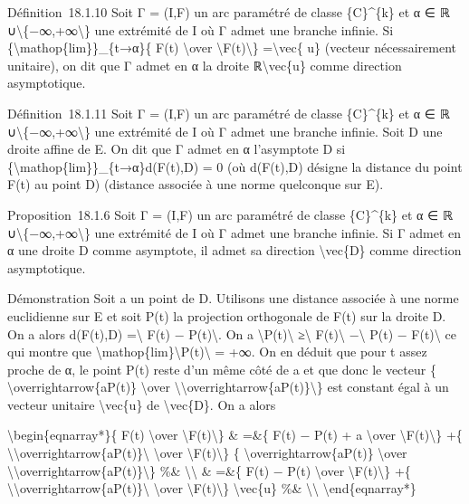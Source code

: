 \documentclass[]{article}
\begin{document}
Définition~18.1.10 Soit Γ = (I,F) un arc paramétré de classe
\{C\}\^{}\{k\} et α ∈ ℝ ∪\textbackslash{}\{−∞,+∞\textbackslash{}\} une
extrémité de I où Γ admet une branche infinie. Si
\{\textbackslash{}mathop\{lim\}\}\_\{t→α\}\{ F(t) \textbackslash{}over
\textbackslash{}\textbar{}F(t)\textbackslash{}\textbar{}\}
=\textbackslash{}vec\{ u\} (vecteur nécessairement unitaire), on dit que
Γ admet en α la droite ℝ\textbackslash{}vec\{u\} comme direction
asymptotique.

Définition~18.1.11 Soit Γ = (I,F) un arc paramétré de classe
\{C\}\^{}\{k\} et α ∈ ℝ ∪\textbackslash{}\{−∞,+∞\textbackslash{}\} une
extrémité de I où Γ admet une branche infinie. Soit D une droite affine
de E. On dit que Γ admet en α l'asymptote D si
\{\textbackslash{}mathop\{lim\}\}\_\{t→α\}d(F(t),D) = 0 (où d(F(t),D)
désigne la distance du point F(t) au point D) (distance associée à une
norme quelconque sur E).

Proposition~18.1.6 Soit Γ = (I,F) un arc paramétré de classe
\{C\}\^{}\{k\} et α ∈ ℝ ∪\textbackslash{}\{−∞,+∞\textbackslash{}\} une
extrémité de I où Γ admet une branche infinie. Si Γ admet en α une
droite D comme asymptote, il admet sa direction \textbackslash{}vec\{D\}
comme direction asymptotique.

Démonstration Soit a un point de D. Utilisons une distance associée à
une norme euclidienne sur E et soit P(t) la projection orthogonale de
F(t) sur la droite D. On a alors d(F(t),D) =\textbackslash{}\textbar{}
F(t) − P(t)\textbackslash{}\textbar{}. On a
\textbackslash{}\textbar{}P(t)\textbackslash{}\textbar{}
≥\textbackslash{}\textbar{} F(t)\textbackslash{}\textbar{}
−\textbackslash{}\textbar{} P(t) − F(t)\textbackslash{}\textbar{} ce qui
montre que
\textbackslash{}mathop\{lim\}\textbackslash{}\textbar{}P(t)\textbackslash{}\textbar{}
= +∞. On en déduit que pour t assez proche de α, le point P(t) reste
d'un même côté de a et que donc le vecteur \{
\textbackslash{}overrightarrow\{aP(t)\} \textbackslash{}over
\textbackslash{}\textbar{}\textbackslash{}overrightarrow\{aP(t)\}\textbackslash{}\textbar{}\}
est constant égal à un vecteur unitaire \textbackslash{}vec\{u\} de
\textbackslash{}vec\{D\}. On a alors

\textbackslash{}begin\{eqnarray*\}\{ F(t) \textbackslash{}over
\textbackslash{}\textbar{}F(t)\textbackslash{}\textbar{}\} \& =\&\{ F(t)
− P(t) + a \textbackslash{}over
\textbackslash{}\textbar{}F(t)\textbackslash{}\textbar{}\} +\{
\textbackslash{}\textbar{}\textbackslash{}overrightarrow\{aP(t)\}\textbackslash{}\textbar{}
\textbackslash{}over
\textbackslash{}\textbar{}F(t)\textbackslash{}\textbar{}\} \{
\textbackslash{}overrightarrow\{aP(t)\} \textbackslash{}over
\textbackslash{}\textbar{}\textbackslash{}overrightarrow\{aP(t)\}\textbackslash{}\textbar{}\}
\%\& \textbackslash{}\textbackslash{} \& =\&\{ F(t) − P(t)
\textbackslash{}over
\textbackslash{}\textbar{}F(t)\textbackslash{}\textbar{}\} +\{
\textbackslash{}\textbar{}\textbackslash{}overrightarrow\{aP(t)\}\textbackslash{}\textbar{}
\textbackslash{}over
\textbackslash{}\textbar{}F(t)\textbackslash{}\textbar{}\}
\textbackslash{}vec\{u\} \%\& \textbackslash{}\textbackslash{}
\textbackslash{}end\{eqnarray*\}
\end{document}
